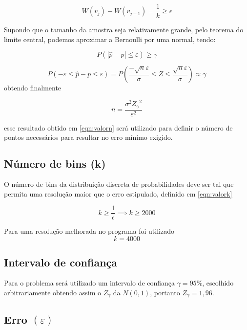 \documentclass{article}
\begin{document}
\begin{equation}
    W(v_j) - W(v_{j-1}) = \frac{1}{k} \geq \epsilon
    \label{eqn:valork}
\end{equation}

Supondo que o tamanho da amostra seja relativamente grande, pelo teorema do limite central, podemos aproximar a Bernoulli por uma normal, tendo:

\[
P(|\hat{p} - p|\leq \varepsilon)\geq \gamma 
\] \cite{estatbas}

\[
P(-\varepsilon \leq \hat{p} - p \leq \varepsilon) = P\left( \frac{-\sqrt{n}\varepsilon}{\sigma} \leq Z \leq \frac{\sqrt{n}\varepsilon}{\sigma}\right) \approx \gamma
\]
obtendo finalmente 

\begin{equation}
    n = \frac {\sigma^2 {Z_\gamma}^2} {\varepsilon^2}
    \label{eqn:valorn}
\end{equation}

esse resultado obtido em \ref{eqn:valorn} será utilizado para definir o número de pontos necessários para resultar no erro mínimo exigido. 

\subsection{Número de bins (k)}

O número de bins da distribuição discreta de probabilidades deve ser tal que permita uma resolução maior que o erro estipulado, definido em \ref{eqn:valork}

\begin{equation}
    k \geq \frac{1}{\epsilon} \implies k \geq 2000
    \label{eqn:valork}
\end{equation}

Para uma resolução melhorada no programa foi utilizado 
\begin{equation*}
    k = 4000
\end{equation*}

\subsection{Intervalo de confiança}

Para o problema será utilizado um intervalo de confiança $\gamma = 95\%$, escolhido arbitrariamente obtendo assim o $Z_\gamma$ da $N(0,1)$, portanto $Z_\gamma = 1,96$.

\subsection{Erro $(\varepsilon)$}
\end{document}

